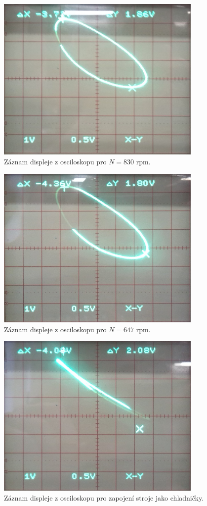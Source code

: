 \documentclass[english]{article}
\begin{document}
    \begin{figure}[h!]
	\begin{center}
	    \includegraphics[width=10cm]{att/3.jpg}
	    	\caption{Záznam displeje z osciloskopu pro $N=830$ rpm.}
			\label{fig:o3}
	\end{center}
	\end{figure}

\clearpage

    \begin{figure}[h!]
	\begin{center}
	    \includegraphics[width=10cm]{att/5.jpg}
	    	\caption{Záznam displeje z osciloskopu pro $N=647$ rpm.}
			\label{fig:o5}
	\end{center}
	\end{figure}

    \begin{figure}[h!]
	\begin{center}
	    \includegraphics[width=10cm]{att/6.jpg}
	    	\caption{Záznam displeje z osciloskopu pro zapojení stroje jako chladničky.}
			\label{fig:o6}
	\end{center}
	\end{figure}	
	
\end{document}
